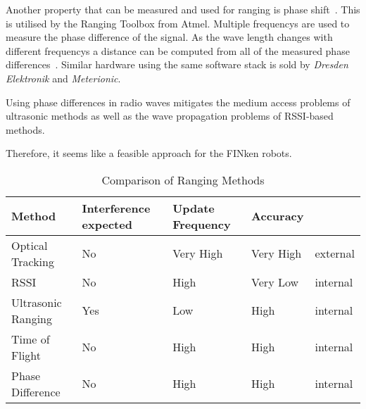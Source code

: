 Another property that can be measured and used for ranging is phase shift~\cite{2_kluge_eggert_2009}.
This is utilised by the Ranging Toolbox from Atmel.
Multiple frequencys are used to measure the phase difference of the signal.
As the wave length changes with different frequencys a distance can be computed from all of the measured phase differences~\cite{atmelranging}.
Similar hardware using the same software stack is sold by \emph{Dresden Elektronik} and \emph{Meterionic}.

Using phase differences in radio waves mitigates the medium access problems of ultrasonic methods as well as the wave propagation problems of RSSI-based methods.

Therefore, it seems like a feasible approach for the FINken robots.


\begin{table}
	\begin{tabularx}{\columnwidth}{l|X|X|X|X}
		\hline
		Method & Interference expected & Update Frequency & Accuracy &  \\ \hline
		Optical Tracking   & No & Very High & Very High & external\\
		RSSI               & No &  High     & Very Low  & internal\\
		Ultrasonic Ranging & Yes& Low       & High & internal\\
		Time of Flight     & No & High      & High & internal\\
		Phase Difference   & No & High      & High & internal\\
		\hline
	\end{tabularx}
	\caption{Comparison of Ranging Methods}
\end{table}

